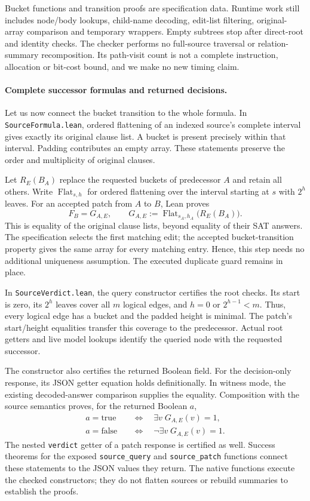 \documentclass[11pt,a4paper]{article}
\numberwithin{equation}{section}
\theoremstyle{plain}
\theoremstyle{definition}
\theoremstyle{remark}
\begin{document}
Bucket functions and transition proofs are specification data. Runtime work still includes node/body lookups, child-name decoding, edit-list filtering, original-array comparison and temporary wrappers. Empty subtrees stop after direct-root and identity checks. The checker performs no full-source traversal or relation-summary recomposition. Its path-visit count is not a complete instruction, allocation or bit-cost bound, and we make no new timing claim.

\paragraph{Complete successor formulas and returned decisions.}
Let us now connect the bucket transition to the whole formula. In \texttt{SourceFormula.lean}, ordered flattening of an indexed source's complete interval gives exactly its original clause list. A bucket is present precisely within that interval. Padding contributes an empty array. These statements preserve the order and multiplicity of original clauses.

Let $R_E(B_A)$ replace the requested buckets of predecessor $A$ and retain all others. Write $\operatorname{Flat}_{s,h}$ for ordered flattening over the interval starting at $s$ with $2^h$ leaves. For an accepted patch from $A$ to $B$, Lean proves
\[
F_B=G_{A,E},\qquad
G_{A,E}:=\operatorname{Flat}_{s_A,h_A}\bigl(R_E(B_A)\bigr).
\]
This is equality of the original clause lists, beyond equality of their SAT answers. The specification selects the first matching edit; the accepted bucket-transition property gives the same array for every matching entry. Hence, this step needs no additional uniqueness assumption. The executed duplicate guard remains in place.

In \texttt{SourceVerdict.lean}, the query constructor certifies the root checks. Its start is zero, its $2^h$ leaves cover all $m$ logical edges, and $h=0$ or $2^{h-1}<m$. Thus, every logical edge has a bucket and the padded height is minimal. The patch's start/height equalities transfer this coverage to the predecessor. Actual root getters and live model lookups identify the queried node with the requested successor.

The constructor also certifies the returned Boolean field. For the decision-only response, its JSON getter equation holds definitionally. In witness mode, the existing decoded-answer comparison supplies the equality. Composition with the source semantics proves, for the returned Boolean $a$,
\[
\begin{aligned}
a=\mathrm{true} &\quad\Longleftrightarrow\quad \exists v\;G_{A,E}(v)=1,\\
a=\mathrm{false} &\quad\Longleftrightarrow\quad \neg\exists v\;G_{A,E}(v)=1.
\end{aligned}
\]
The nested \texttt{verdict} getter of a patch response is certified as well. Success theorems for the exposed \texttt{source\_query} and \texttt{source\_patch} functions connect these statements to the JSON values they return. The native functions execute the checked constructors; they do not flatten sources or rebuild summaries to establish the proofs.
\end{document}
